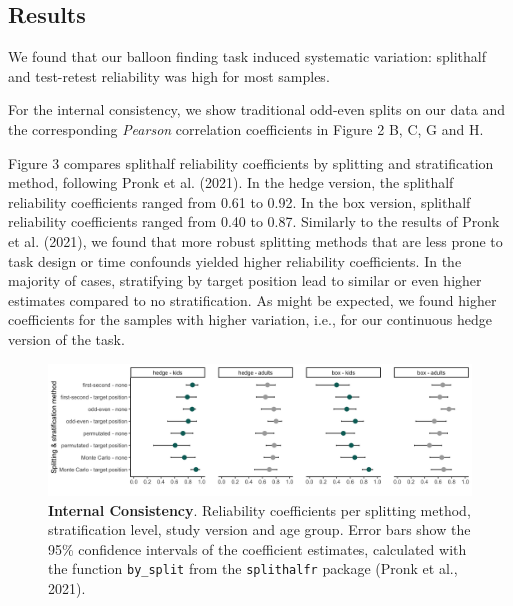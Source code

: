 \documentclass[
  man,floatsintext]{apa6}
\begin{document}
\hypertarget{results-1}{%
\subsection{Results}\label{results-1}}

We found that our balloon finding task induced systematic variation: splithalf and test-retest reliability was high for most samples.

For the internal consistency, we show traditional odd-even splits on our data and the corresponding \emph{Pearson} correlation coefficients in Figure 2 B, C, G and H.

Figure 3 compares splithalf reliability coefficients by splitting and stratification method, following Pronk et al. (2021).
In the hedge version, the splithalf reliability coefficients ranged from 0.61 to 0.92. In the box version, splithalf reliability coefficients ranged from 0.40 to 0.87.
Similarly to the results of Pronk et al. (2021), we found that more robust splitting methods that are less prone to task design or time confounds yielded higher reliability coefficients. In the majority of cases, stratifying by target position lead to similar or even higher estimates compared to no stratification. As might be expected, we found higher coefficients for the samples with higher variation, i.e., for our continuous hedge version of the task.




\begin{figure}

{\centering \includegraphics[width=1\linewidth]{../figures/gafo_splithalf} 

}

\caption{\textbf{Internal Consistency}.
Reliability coefficients per splitting method, stratification level, study version and age group. Error bars show the 95\% confidence intervals of the coefficient estimates, calculated with the function \texttt{by\_split} from the \texttt{splithalfr} package (Pronk et al., 2021).}\label{fig:fig3}
\end{figure}
\end{document}
